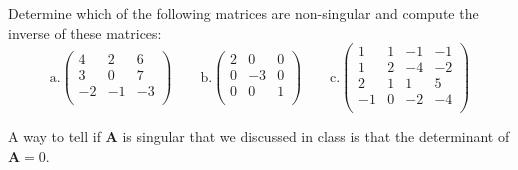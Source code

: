 \documentclass[12pts, answers]{exam}
\newcommand{\ve}[1]{\ensuremath{\mathbf{#1}}}
\begin{document}
\begin{questions}

\addpoints
\question[10] 
Determine which of the following matrices are non-singular and compute the inverse of these matrices:
\newcommand{\aaa}{4}
\newcommand{\aab}{2}
\newcommand{\aac}{6}
\newcommand{\aba}{3}
\newcommand{\abb}{0}
\newcommand{\abc}{7}
\newcommand{\aca}{-2}
\newcommand{\acb}{-1}
\newcommand{\acc}{-3}
\newcommand{\baa}{2}
\newcommand{\bab}{0}
\newcommand{\bac}{0}
\newcommand{\bba}{0}
\newcommand{\bbb}{-3}
\newcommand{\bbc}{0}
\newcommand{\bca}{0}
\newcommand{\bcb}{0}
\newcommand{\bcc}{1}
\newcommand{\caa}{1}
\newcommand{\cab}{1}
\newcommand{\cac}{-1}
\newcommand{\cad}{-1}
\newcommand{\cba}{1}
\newcommand{\cbb}{2}
\newcommand{\cbc}{-4}
\newcommand{\cbd}{-2}
\newcommand{\cca}{2}
\newcommand{\ccb}{1}
\newcommand{\ccc}{1}
\newcommand{\ccd}{5}
\newcommand{\cda}{-1}
\newcommand{\cdb}{0}
\newcommand{\cdc}{-2}
\newcommand{\cdd}{-4}
\begin{equation}
\text{a.} \begin{pmatrix}
   \aaa & \aab & \aac \\
   \aba & \abb & \abc \\
   \aca & \acb & \acc \\
\end{pmatrix} \qquad
%
\text{b.} \begin{pmatrix}
   \baa & \bab & \bac \\
   \bba & \bbb & \bbc \\
   \bca & \bcb & \bcc \\
\end{pmatrix} \qquad
%
\text{c.} \begin{pmatrix}
  \caa & \cab & \cac & \cad \\
  \cba & \cbb & \cbc & \cbd \\
  \cca & \ccb & \ccc & \ccd \\
  \cda & \cdb & \cdc & \cdd \\
\end{pmatrix} \nonumber
\end{equation}

\begin{solution}
A way to tell if $\ve{A}$ is singular that we discussed in class is that the determinant of $\ve{A}=0$.

\begin{parts}

\end{parts}
\end{solution}
\end{questions}
\end{document}
